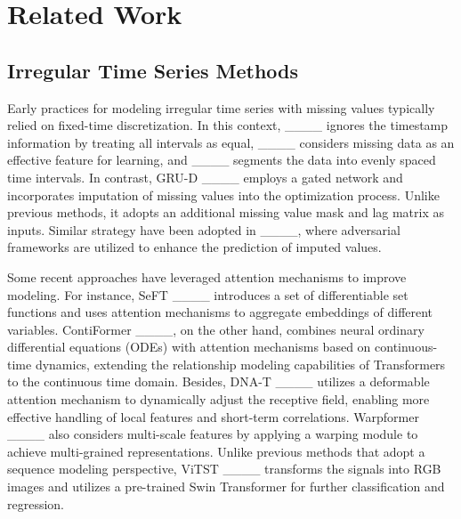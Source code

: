 \section{Related Work}
\subsection{Irregular Time Series Methods}

Early practices for modeling irregular time series with missing values typically relied on fixed-time discretization. In this context, ____ ignores the timestamp information by treating all intervals as equal, ____ considers missing data as an effective feature for learning, 
and ____ segments the data into evenly spaced time intervals. In contrast, GRU-D ____ employs a gated network and incorporates imputation of missing values into the optimization process. Unlike previous methods, it adopts an additional missing value mask and lag matrix as inputs. Similar strategy have been adopted in ____, where adversarial frameworks are utilized to enhance the prediction of imputed values. 

Some recent approaches have leveraged attention mechanisms to improve modeling. For instance, SeFT ____ introduces a set of differentiable set functions and uses attention mechanisms to aggregate embeddings of different variables. ContiFormer ____, on the other hand, combines neural ordinary differential equations (ODEs) with attention mechanisms based on continuous-time dynamics, extending the relationship modeling capabilities of Transformers to the continuous time domain. Besides, DNA-T ____ utilizes a deformable attention mechanism to dynamically adjust the receptive field, enabling more effective handling of local features and short-term correlations. Warpformer ____ also considers multi-scale features by applying a warping module to achieve multi-grained representations. Unlike previous methods that adopt a sequence modeling perspective, ViTST ____ transforms the signals into RGB images and utilizes a pre-trained Swin Transformer for further classification and regression.


